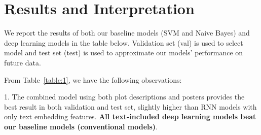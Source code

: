 \documentclass[12pt]{article} %
\begin{document}
\section {Results and Interpretation}

We report the results of both our baseline models (SVM and Naive Bayes) and deep learning models in the table below. Validation set (val) is used to select model and test set (test) is used to approximate our models' performance on future data.

\begin{table}[h!]
\centering
{}
\caption{Results on Validation Set and Test Set}
\label{table:1}
\end{table}

From Table~\ref{table:1}, we have the following observations:

1. The combined model using both plot descriptions and posters provides the best result in both validation and test set, slightly higher than RNN models with only text embedding features. {\bf All text-included deep learning models beat our baseline models (conventional models)}.
\end{document}
